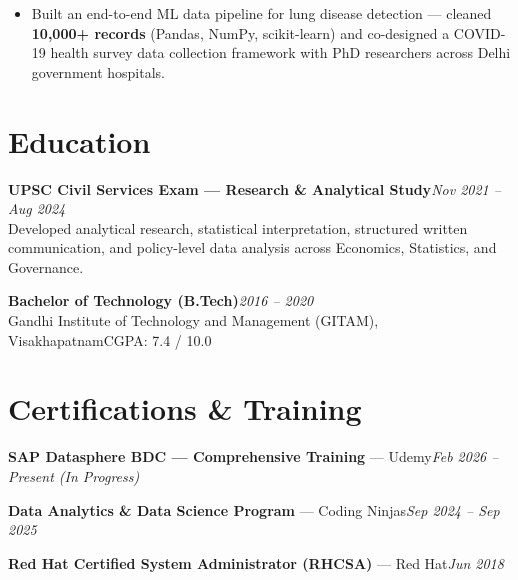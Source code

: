 \documentclass[10pt, letterpaper]{article}
\begin{document}
\begin{itemize}
  \item Built an end-to-end ML data pipeline for lung disease detection — cleaned \textbf{10,000+ records} (Pandas, NumPy, scikit-learn) and co-designed a COVID-19 health survey data collection framework with PhD researchers across Delhi government hospitals.
\end{itemize}

\section{Education}

{\bfseries UPSC Civil Services Exam — Research \& Analytical Study}\hfill{\small\color{muted}\textit{Nov 2021 – Aug 2024}}\\
{\small\color{muted}Developed analytical research, statistical interpretation, structured written communication, and policy-level data analysis across Economics, Statistics, and Governance.}

\vspace{2pt}
{\bfseries Bachelor of Technology (B.Tech)}\hfill{\small\color{muted}\textit{2016 – 2020}}\\
{\small\color{muted}Gandhi Institute of Technology and Management (GITAM), Visakhapatnam\hfill CGPA: 7.4 / 10.0}

\section{Certifications \& Training}

{\bfseries SAP Datasphere BDC — Comprehensive Training} — Udemy\hfill{\small\color{muted}\textit{Feb 2026 – Present \emph{(In Progress)}}}

\vspace{1pt}
{\bfseries Data Analytics \& Data Science Program} — Coding Ninjas\hfill{\small\color{muted}\textit{Sep 2024 – Sep 2025}}

\vspace{1pt}
{\bfseries Red Hat Certified System Administrator (RHCSA)} — Red Hat\hfill{\small\color{muted}\textit{Jun 2018}}

\end{document}
